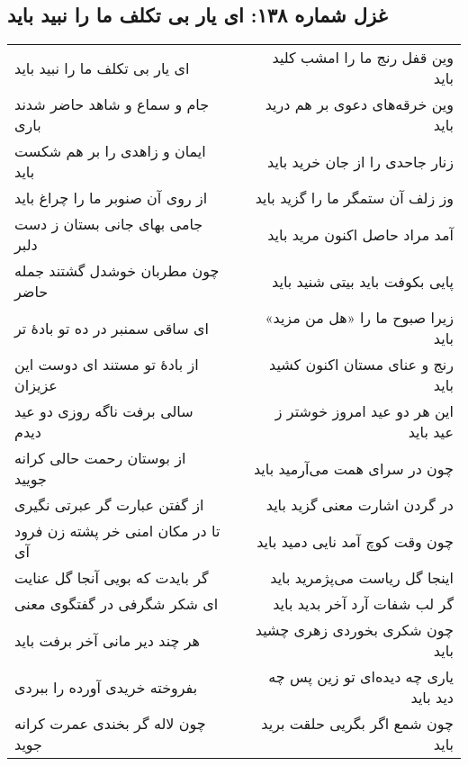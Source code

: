 \begin{center}
\section*{غزل شماره ۱۳۸: ای یار بی تکلف ما را نبید باید}
\label{sec:138}
\begin{longtable}{l p{0.5cm} r}
ای یار بی تکلف ما را نبید باید
&&
وین قفل رنج ما را امشب کلید باید
\\
جام و سماع و شاهد حاضر شدند باری
&&
وین خرقه‌های دعوی بر هم درید باید
\\
ایمان و زاهدی را بر هم شکست باید
&&
زنار جاحدی را از جان خرید باید
\\
از روی آن صنوبر ما را چراغ باید
&&
وز زلف آن ستمگر ما را گزید باید
\\
جامی بهای جانی بستان ز دست دلبر
&&
آمد مراد حاصل اکنون مرید باید
\\
چون مطربان خوشدل گشتند جمله حاضر
&&
پایی بکوفت باید بیتی شنید باید
\\
ای ساقی سمنبر در ده تو بادهٔ تر
&&
زیرا صبوح ما را «هل من مزید» باید
\\
از بادهٔ تو مستند ای دوست این عزیزان
&&
رنج و عنای مستان اکنون کشید باید
\\
سالی برفت ناگه روزی دو عید دیدم
&&
این هر دو عید امروز خوشتر ز عید باید
\\
از بوستان رحمت حالی کرانه جویید
&&
چون در سرای همت می‌آرمید باید
\\
از گفتن عبارت گر عبرتی نگیری
&&
در گردن اشارت معنی گزید باید
\\
تا در مکان امنی خر پشته زن فرود آی
&&
چون وقت کوچ آمد نایی دمید باید
\\
گر بایدت که بویی آنجا گل عنایت
&&
اینجا گل ریاست می‌پژمرید باید
\\
ای شکر شگرفی در گفتگوی معنی
&&
گر لب شفات آرد آخر بدید باید
\\
هر چند دیر مانی آخر برفت باید
&&
چون شکری بخوردی زهری چشید باید
\\
بفروخته خریدی آورده را ببردی
&&
یاری چه دیده‌ای تو زین پس چه دید باید
\\
چون لاله گر بخندی عمرت کرانه جوید
&&
چون شمع اگر بگریی حلقت برید باید
\\
\end{longtable}
\end{center}
